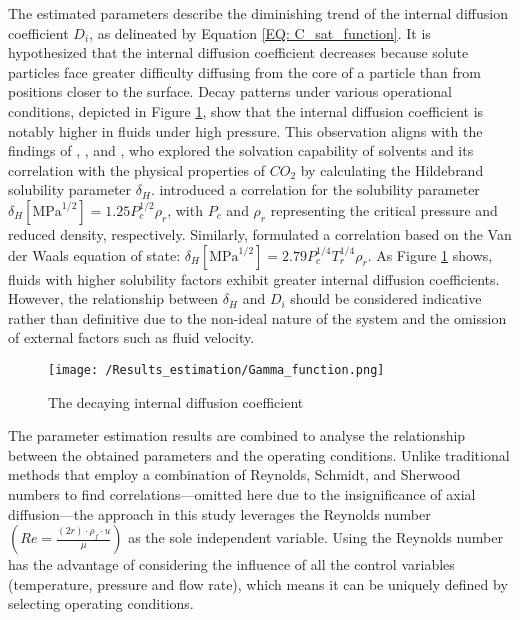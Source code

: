 \documentclass[../Supercritical_fluid_extraction_of_essential_oil_from_chamomile.tex]{subfiles}
\begin{document}
	The estimated parameters describe the diminishing trend of the internal diffusion coefficient $D_i$, as delineated by Equation \ref{EQ: C_sat_function}. It is hypothesized that the internal diffusion coefficient decreases because solute particles face greater difficulty diffusing from the core of a particle than from positions closer to the surface. Decay patterns under various operational conditions, depicted in Figure \ref{fig: Gamma_function}, show that the internal diffusion coefficient is notably higher in fluids under high pressure. This observation aligns with the findings of \citet{Giddings1968}, \citet{Gurdial1989}, and \citet{Machida2011}, who explored the solvation capability of solvents and its correlation with the physical properties of $CO_2$ by calculating the Hildebrand solubility parameter $\delta_H$. \citet{Giddings1968} introduced a correlation for the solubility parameter $\delta_H[\text{MPa}^{1/2}] = 1.25 P_c^{1/2}\rho_r$, with $P_c$ and $\rho_r$ representing the critical pressure and reduced density, respectively. Similarly, \citet{Marcus2006} formulated a correlation based on the Van der Waals equation of state: $\delta_H[\text{MPa}^{1/2}] = 2.79 P_c^{1/4}T_r^{1/4}\rho_r$. As Figure \ref{fig: Gamma_function} shows, fluids with higher solubility factors exhibit greater internal diffusion coefficients. However, the relationship between $\delta_H$ and $D_i$ should be considered indicative rather than definitive due to the non-ideal nature of the system and the omission of external factors such as fluid velocity.
	
	\begin{figure}[!h]
		\centering
		\texttt{[image: /Results\_estimation/Gamma\_function.png]}
		\caption{The decaying internal diffusion coefficient}
		\label{fig: Gamma_function}
	\end{figure}
		
	The parameter estimation results are combined to analyse the relationship between the obtained parameters and the operating conditions. Unlike traditional methods that employ a combination of Reynolds, Schmidt, and Sherwood numbers to find correlations—omitted here due to the insignificance of axial diffusion—the approach in this study leverages the Reynolds number $\left(Re = \frac{(2r) \cdot \rho_f \cdot u}{\mu}\right)$ as the sole independent variable. Using the Reynolds number has the advantage of considering the influence of all the control variables (temperature, pressure and flow rate), which means it can be uniquely defined by selecting operating conditions.	
	
\end{document}
